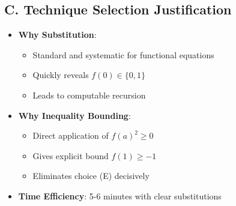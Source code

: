 \documentclass[12pt]{article}
\begin{document}
\begin{techniquesbox}
\subsection*{C. Technique Selection Justification}
\begin{itemize}[leftmargin=*]
    \item \textbf{Why Substitution}: 
    \begin{itemize}
        \item Standard and systematic for functional equations
        \item Quickly reveals $f(0) \in \{0, 1\}$
        \item Leads to computable recursion
    \end{itemize}
    \item \textbf{Why Inequality Bounding}: 
    \begin{itemize}
        \item Direct application of $f(a)^2 \geq 0$
        \item Gives explicit bound $f(1) \geq -1$
        \item Eliminates choice (E) decisively
    \end{itemize}
    \item \textbf{Time Efficiency}: 5-6 minutes with clear substitutions
\end{itemize}
\end{techniquesbox}
\end{document}

